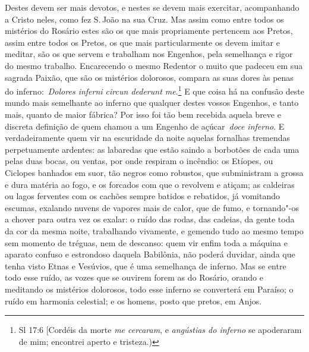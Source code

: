 Destes devem ser mais devotos, e nestes se devem mais
exercitar, acompanhando a Cristo neles, como fez S.\,João na sua Cruz.
Mas assim como entre todos os mistérios do Rosário estes são os que mais
propriamente pertencem aos Pretos, assim entre todos os Pretos, os que
mais particularmente os devem imitar e meditar, são os que servem e
trabalham nos Engenhos, pela semelhança e rigor do mesmo trabalho.
Encarecendo o mesmo Redentor o muito que padeceu em sua sagrada Paixão,
que são os mistérios dolorosos, compara as suas dores às penas do
inferno:~\emph{Dolores inferni circun dederunt me}.\footnote{Sl 17:6 [Cordéis da morte \textit{me cercaram}, e \textit{angústias do inferno} se apoderaram de mim; encontrei
aperto e tristeza.)} E
que coisa há na confusão deste mundo mais semelhante ao inferno que
qualquer destes vossos Engenhos, e tanto mais, quanto de maior fábrica?
Por isso foi tão bem recebida aquela breve e discreta definição de quem
chamou a um Engenho de açúcar~\emph{doce inferno}. E verdadeiramente
quem vir na escuridade da noite aquelas fornalhas tremendas
perpetuamente ardentes: as labaredas que estão saindo a borbotões de
cada uma pelas duas bocas, ou ventas, por onde respiram o incêndio: os
Etíopes, ou Ciclopes banhados em suor, tão negros como robustos, que
subministram a grossa e dura matéria ao fogo, e os forcados com que o
revolvem e atiçam; as caldeiras ou lagos ferventes com os cachões sempre
batidos e rebatidos, já vomitando escumas, exalando nuvens de vapores
mais de calor, que de fumo, e tornando"-os a chover para outra vez os
exalar: o ruído das rodas, das cadeias, da gente toda da cor da mesma
noite, trabalhando vivamente, e gemendo tudo ao mesmo tempo sem momento
de tréguas, nem de descanso: quem vir enfim toda a máquina e aparato
confuso e estrondoso daquela Babilônia, não poderá duvidar, ainda que
tenha visto Etnas e Vesúvios, que é uma semelhança de inferno. Mas se
entre todo esse ruído, as vozes que se ouvirem forem as do Rosário,
orando e meditando os mistérios dolorosos, todo esse inferno se
converterá em Paraíso; o ruído em harmonia celestial; e os homens, posto
que pretos, em Anjos.


